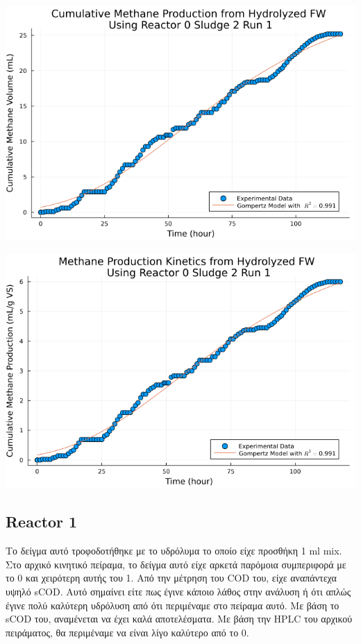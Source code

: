 \documentclass[11pt]{article}
\begin{document}
\begin{center}
\includegraphics[width=.9\linewidth]{../plots/BMPs/Hydrolyzed FW/methane_kinetics_hydrolysate_0_s2_r1_hour.png}
\end{center}

\begin{center}
\includegraphics[width=.9\linewidth]{../plots/BMPs/Hydrolyzed FW/specific_methane_kinetics_hydrolysate_0_s2_r1_hour.png}
\end{center}

\subsection{Reactor 1}
\label{sec:orga4e70b9}
Το δείγμα αυτό τροφοδοτήθηκε με το υδρόλυμα το οποίο είχε προσθήκη 1 ml mix. Στο αρχικό κινητικό πείραμα, το δείγμα αυτό είχε αρκετά παρόμοια συμπεριφορά με το 0 και χειρότερη αυτής του 1. Από την μέτρηση του COD του, είχε αναπάντεχα υψηλό sCOD. Αυτό σημαίνει είτε πως έγινε κάποιο λάθος στην ανάλυση ή ότι απλώς έγινε πολύ καλύτερη υδρόλυση από ότι περιμέναμε στο πείραμα αυτό. Με βάση το sCOD του, αναμένεται να έχει καλά αποτελέσματα. Με βάση την HPLC του αρχικού πειράματος, θα περιμέναμε να είναι λίγο καλύτερο από το 0.
\end{document}
